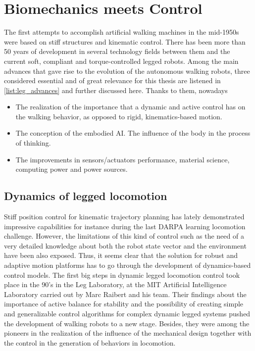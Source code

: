 
\section{Biomechanics meets Control} %
\label{sec:biomechanics_vs_control}
The first attempts to accomplish artificial walking machines in the mid-1950s were based on stiff structures and kinematic control.
There has been more than 50 years of development in several technology fields between them and the current soft, compliant and torque-controlled legged robots.
Among the main advances that gave rise to the evolution of the autonomous walking robots, three considered essential and of great relevance for this thesis are listened in \ref{list:leg_advances} and further discussed here.
Thanks to them, nowadays 

\begin{itemize}
\label{list:leg_advances}
	\item The realization of the importance that a dynamic and active control has on the walking behavior, as opposed to rigid, kinematics-based motion.
	\item The conception of the embodied AI. The influence of the body in the process of thinking.
	\item The improvements in sensors/actuators performance, material science, computing power and power sources.
\end{itemize}

\subsection{Dynamics of legged locomotion} %
\label{sub:dynamics_control}
Stiff position control for kinematic trajectory planning has lately demonstrated impressive capabilities for instance during the last DARPA learning locomotion challenge.
However, the limitations of this kind of control such as the need of a very detailed knowledge  about both the robot state vector and the environment have been also exposed.
Thus, it seems clear that the solution for robust and adaptive motion platforms has to go through the development of dynamics-based control models.
The first big steps in dynamic legged locomotion control took place in the 90's in the Leg Laboratory, at the MIT Artificial Intelligence Laboratory carried out by Marc Raibert and his team.
Their findings about the importance of active balance for stability and the possibility of creating simple and generalizable control algorithms for complex dynamic legged systems \cite{mit_leg_lab1} pushed the development of walking robots to a new stage.
Besides, they were among the pioneers in the realization of the influence of the mechanical design together with the control in the generation of behaviors in locomotion.

